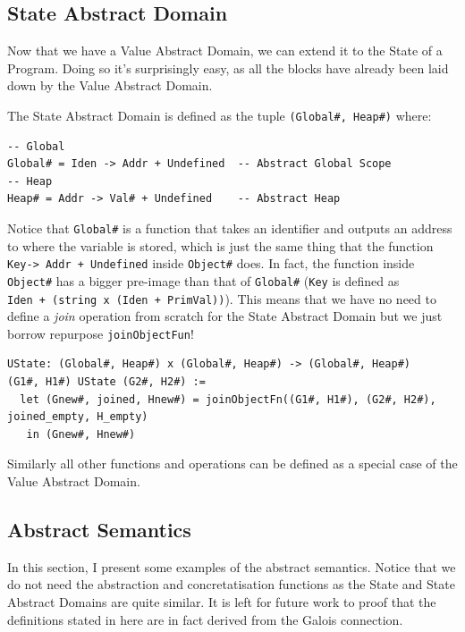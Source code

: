 \documentclass[
11pt, %
english, %
singlespacing, %
headsepline, %
]{MastersDoctoralThesis} %
\begin{document}
\hypertarget{state-abstract-domain-1}{%
\subsection{State Abstract Domain}\label{state-abstract-domain-1}}

Now that we have a Value Abstract Domain, we can extend it to the State
of a Program. Doing so it's surprisingly easy, as all the blocks have
already been laid down by the Value Abstract Domain.

The State Abstract Domain is defined as the tuple
\texttt{(Global\#,\ Heap\#)} where:

\begin{verbatim}
-- Global
Global# = Iden -> Addr + Undefined  -- Abstract Global Scope
-- Heap
Heap# = Addr -> Val# + Undefined    -- Abstract Heap
\end{verbatim}

Notice that \texttt{Global\#} is a function that takes an identifier and
outputs an address to where the variable is stored, which is just the
same thing that the function
\texttt{Key-\textgreater{}\ Addr\ +\ Undefined} inside \texttt{Object\#}
does. In fact, the function inside \texttt{Object\#} has a bigger
pre-image than that of \texttt{Global\#} (\texttt{Key} is defined as
\texttt{Iden\ +\ (string\ x\ (Iden\ +\ PrimVal))}). This means that we
have no need to define a \emph{join} operation from scratch for the
State Abstract Domain but we just borrow repurpose
\texttt{joinObjectFun}!

\begin{verbatim}
UState: (Global#, Heap#) x (Global#, Heap#) -> (Global#, Heap#)
(G1#, H1#) UState (G2#, H2#) :=
  let (Gnew#, joined, Hnew#) = joinObjectFn((G1#, H1#), (G2#, H2#), joined_empty, H_empty)
   in (Gnew#, Hnew#)
\end{verbatim}

Similarly all other functions and operations can be defined as a special
case of the Value Abstract Domain.

\hypertarget{abstract-semantics-1}{%
\subsection{Abstract Semantics}\label{abstract-semantics-1}}

In this section, I present some examples of the abstract semantics.
Notice that we do not need the abstraction and concretatisation
functions as the State and State Abstract Domains are quite similar. It
is left for future work to proof that the definitions stated in here are
in fact derived from the Galois connection.
\end{document}
